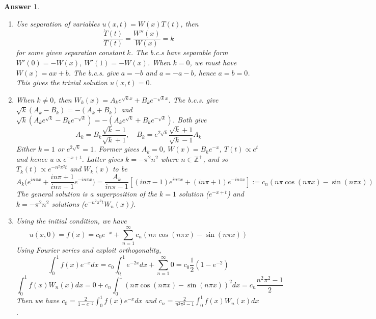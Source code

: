 \documentclass[a4paper]{article}
\newtheorem{ans}{Answer}[section]
\theoremstyle{new}
\begin{document}
\begin{ans}\leavevmode
\begin{enumerate}[label=(\roman*)]
\item Use separation of variables $u(x,t)=W(x)T(t)$, then
$$\frac{\dot{T}(t)}{T(t)}=\frac{W''(x)}{W(x)}=k$$
for some given separation constant $k$. The b.c.s have separable form $W'(0)=-W(x)$, $W'(1)=-W(x)$. When $k=0$, we must have $W(x)=ax+b$. The b.c.s. give $a=-b$ and $a=-a-b$, hence $a=b=0$. This gives the trivial solution $u(x,t)=0$.
\item When $k\neq 0$, then $W_k(x)=A_ke^{\sqrt{k}x}+B_ke^{-\sqrt{k}x}$. The b.c.s. give $\sqrt{k}(A_k-B_k)=-(A_k+B_k)$ and $\sqrt{k}(A_ke^{\sqrt{k}}-B_ke^{-\sqrt{k}})=-(A_ke^{\sqrt{k}}+B_ke^{-\sqrt{k}})$. Both give
$$A_k=B_k\frac{\sqrt{k}-1}{\sqrt{k}+1},\quad B_k=e^{2\sqrt{k}}\frac{\sqrt{k}+1}{\sqrt{k}-1}A_k$$
Either $k=1$ or $e^{2\sqrt{k}}=1$. Former gives $A_k=0$, $W(x)=B_ke^{-x}$, $T(t)\propto e^{t}$ and hence $u\propto e^{-x+t}$. Latter gives $k=-\pi^2n^2$ where $n\in\mathbb{Z}^+$, and so $T_k(t)\propto e^{-n^2\pi^2t}$ and $W_k(x)$ to be
$$A_k\bigg(e^{in\pi x}+\frac{in\pi+1}{in\pi-1}e^{-in\pi x}\bigg)=\frac{A_k}{in\pi -1}[(in\pi -1)e^{in\pi x}+(in\pi +1)e^{-in\pi x}]:=c_n(n\pi\cos(n\pi x)-\sin(n\pi x))$$
The general solution is a superposition of the $k=1$ solution ($e^{-x+t}$) and $k=-\pi^2n^2$ solutions ($e^{-n^2\pi^2t}W_n(x)$).
\newpage
\item Using the initial condition, we have
$$u(x,0)=f(x)=c_0e^{-x}+\sum_{n=1}^\infty c_n(n\pi\cos(n\pi x)-\sin(n\pi x))$$
Using Fourier series and exploit orthogonality,
$$\int_0^1f(x)e^{-x}dx=c_0\int_0^1e^{-2x}dx+\sum_{n=1}^\infty 0=c_0\frac{1}{2}(1-e^{-2})$$
$$\int_0^1f(x)W_n(x)dx=0+c_n\int_0^1(n\pi\cos (n\pi x)-\sin(n\pi x))^2dx=c_n\frac{n^2\pi^2-1}{2}$$
Then we have $c_0=\frac{2}{1-e^{-2}}\int_0^1f(x)e^{-x}dx$ and $c_n=\frac{2}{n^2\pi^2-1}\int_0^1f(x)W_n(x)dx$.
\end{enumerate}
\end{ans}
\end{document}

